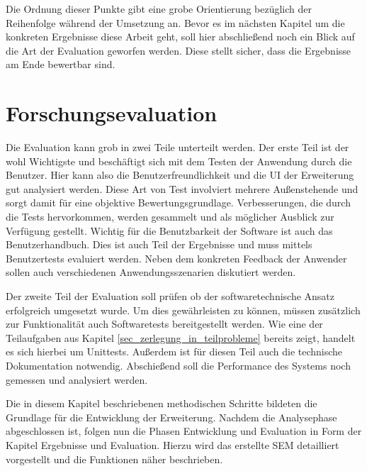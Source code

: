 Die Ordnung dieser Punkte gibt eine grobe Orientierung bezüglich der Reihenfolge
während der Umsetzung an. Bevor es im nächsten Kapitel um die konkreten
Ergebnisse diese Arbeit geht, soll hier abschließend noch ein Blick auf die Art der
Evaluation geworfen werden. Diese stellt sicher, dass die Ergebnisse am Ende bewertbar
sind.

\section{Forschungsevaluation}
Die Evaluation kann grob in zwei Teile unterteilt werden. Der erste Teil ist der
wohl Wichtigste und beschäftigt sich mit dem Testen der Anwendung durch die
Benutzer. Hier kann also die Benutzerfreundlichkeit und die \ac{UI} der
Erweiterung gut analysiert werden. Diese Art von Test involviert mehrere Außenstehende
und sorgt damit für eine objektive Bewertungsgrundlage. Verbesserungen, die durch
die Tests hervorkommen, werden gesammelt und als möglicher Ausblick zur
Verfügung gestellt. Wichtig für die Benutzbarkeit der Software ist auch das Benutzerhandbuch.
Dies ist auch Teil der Ergebnisse und muss mittels Benutzertests evaluiert
werden. Neben dem konkreten Feedback der Anwender sollen auch verschiedenen Anwendungsszenarien
diskutiert werden.

Der zweite Teil der Evaluation soll prüfen ob der softwaretechnische Ansatz erfolgreich
umgesetzt wurde. Um dies gewährleisten zu können, müssen zusätzlich zur Funktionalität
auch Softwaretests bereitgestellt werden. Wie eine der Teilaufgaben aus Kapitel
\ref{sec_zerlegung_in_teilprobleme} bereits zeigt, handelt es sich hierbei um Unittests.
Außerdem ist für diesen Teil auch die technische Dokumentation notwendig. Abschießend
soll die Performance des Systems noch gemessen und analysiert werden.

Die in diesem Kapitel beschriebenen methodischen Schritte bildeten die Grundlage
für die Entwicklung der Erweiterung. Nachdem die Analysephase abgeschlossen ist,
folgen nun die Phasen Entwicklung und Evaluation in Form der Kapitel Ergebnisse und
Evaluation. Hierzu wird das erstellte \ac{SEM} detailliert vorgestellt und die Funktionen
näher beschrieben.
